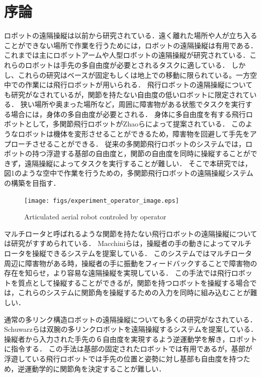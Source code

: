 \documentclass{jarticle}
\begin{document}
\section{序論}
ロボットの遠隔操縦は以前から研究されている\cite{survey_on_teleop}．遠く離れた場所や人が立ち入ることができない場所で作業を行うためには，ロボットの遠隔操縦は有用である．
これまでは主にロボットアームや人型ロボットの遠隔操縦が研究されている\cite{survey_on_humanoid}．これらのロボットは手先の多自由度が必要とされるタスクに適している．
しかし、これらの研究はベースが固定もしくは地上での移動に限られている。一方空中での作業には飛行ロボットが用いられる．
飛行ロボットの遠隔操縦についても研究がなされているが，関節を持たない自由度の低いロボットに限定されている．
狭い場所や奥まった場所など，周囲に障害物がある状態でタスクを実行する場合には，身体の多自由度が必要とされる．
身体に多自由度を有する飛行ロボットとして，多関節飛行ロボットがZhaoら\cite{hydrus_xi}によって提案されている．
このようなロボットは機体を変形させることができるため，障害物を回避して手先をアプローチさせることができる．
従来の多関節飛行ロボットのシステムでは，ロボットの持つ浮遊する基部の自由度と，関節の自由度を同時に操縦することができず，遠隔操縦によってタスクを実行することが難しい．
そこで本研究では，図1のような空中で作業を行うための，多関節飛行ロボットの遠隔操縦システムの構築を目指す．
\begin{figure}[tb]
    \centering
    \texttt{[image: figs/experiment\_operator\_image.eps]}
    \caption{Articulated aerial robot controled by operator}
    \label{fig:total_system_image}
\end{figure}

マルチロータと呼ばれるような関節を持たない飛行ロボットの遠隔操縦については研究がすすめられている．
Macchiniら\cite{drone_hand_haptics}は，操縦者の手の動きによってマルチロータを操縦できるシステムを提案している．
このシステムではマルチロータ周辺に障害物がある時，操縦者の手に振動をフィードバックすることで障害物の存在を知らせ，より容易な遠隔操縦を実現している．
この手法では飛行ロボットを質点として操縦することができるが，関節を持つロボットを操縦する場合では，これらのシステムに関節角を操縦するための入力を同時に組み込むことが難しい．

通常の多リンク構造ロボットの遠隔操縦についても多くの研究がなされている．
Schuwarzら\cite{nimbro}は双腕の多リンクロボットを遠隔操縦するシステムを提案している．
操縦者から入力された手先の６自由度を実現するよう逆運動学を解き，ロボットに指令する．
この手法は基部の固定されたロボットでは有用であるが，基部が浮遊している飛行ロボットでは手先の位置と姿勢に対し基部も自由度を持つため，逆運動学的に関節角を決定することが難しい．
\end{document}
